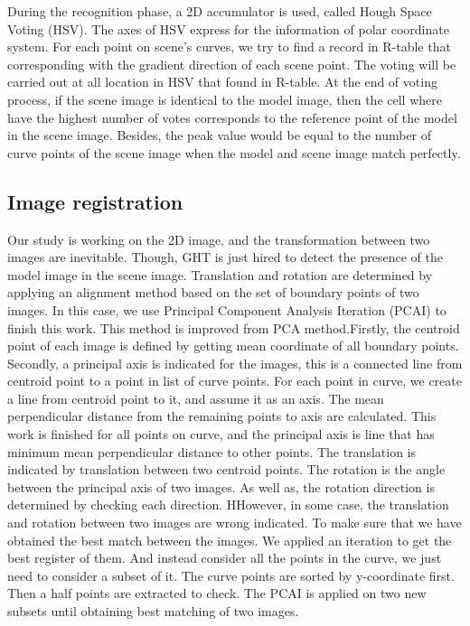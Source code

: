 \documentclass[twoside,twocolumn,10pt]{article}
\begin{document}
During the recognition phase, a 2D accumulator is used, called Hough Space Voting (HSV). The axes of HSV express for the information of polar coordinate system. For each point on scene's curves, we try to find a record in R-table that corresponding with the gradient direction of each scene point. The voting will be carried out at all location in HSV that found in R-table. At the end of voting process, if the scene image is identical to the model image, then the cell where have the highest number of votes corresponds to the reference point of the model in the scene image. Besides, the peak value would be equal to the number of curve points of the scene image when the model and scene image match perfectly.
\subsection{Image registration}
Our study is working on the 2D image, and the transformation between two images are inevitable. Though, GHT is just hired to detect the presence of the model image in the scene image. Translation and rotation are determined by applying an alignment method based on the set of boundary points of two images. In this case, we use Principal Component Analysis Iteration (PCAI) to finish this work. This method is improved from PCA method\cite{pca}.Firstly, the centroid point of each image is defined by getting mean coordinate of all boundary points. Secondly, a principal axis is indicated for the images, this is a connected line from centroid point to a point in list of curve points. For each point in curve, we create a line from centroid point to it, and assume it as an axis. The mean perpendicular distance from the remaining points to axis are calculated. This work is finished for all points on curve, and the principal axis is line that has minimum mean perpendicular distance to other points. The translation is indicated by translation between two centroid points. The rotation is the angle between the principal axis of two images. As well as, the rotation direction is determined by checking each direction. HHowever, in some case, the translation and rotation between two images are wrong indicated. To make sure that we have obtained the best match between the images. We applied an iteration to get the best register of them. And instead consider all the points in the curve, we just need to consider a subset of it. The curve points are sorted by y-coordinate first. Then a half points are extracted to check. The PCAI is applied on two new subsets until obtaining best matching of two images.
\end{document}
